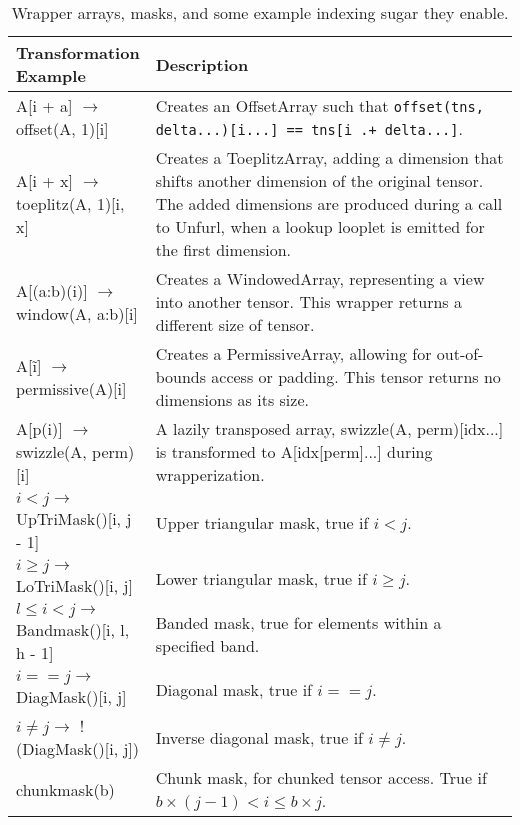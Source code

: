     \begin{table}[h]
        \scriptsize
        \centering
        \begin{tabular}{|>{\raggedright\arraybackslash}m{0.25\linewidth}|>{\raggedright\arraybackslash}m{0.75\linewidth}|}
        \hline
        \textbf{Transformation Example} & \textbf{Description} \\
        \hline
        A[i + a] $\rightarrow$ offset(A, 1)[i] & Creates an OffsetArray such that \texttt{offset(tns, delta...)[i...] == tns[i .+ delta...]}. \\
        \hline
        A[i + x] $\rightarrow$ toeplitz(A, 1)[i, x] & Creates a ToeplitzArray, adding a dimension that shifts another dimension of the original tensor. The added dimensions are produced during a call to Unfurl, when a lookup looplet is emitted for the first dimension. \\
        \hline
        A[(a:b)(i)] $\rightarrow$ window(A, a:b)[i] & Creates a WindowedArray, representing a view into another tensor. This wrapper returns a different size of tensor. \\
        \hline
        A[\~i] $\rightarrow$ permissive(A)[i] & Creates a PermissiveArray, allowing for out-of-bounds access or padding. This tensor returns no dimensions as its size. \\
        \hline
        \hline
        A[p(i)] $\rightarrow$ swizzle(A, perm)[i] & A lazily transposed array, swizzle(A, perm)[idx...] is transformed to A[idx[perm]...] during wrapperization. \\
        \hline
        $i < j \rightarrow$ UpTriMask()[i, j - 1] & Upper triangular mask, true if $i < j$. \\
        \hline
        $i \geq j \rightarrow$ LoTriMask()[i, j] & Lower triangular mask, true if $i \geq j$. \\
        \hline
        $l \leq i < j \rightarrow$ Bandmask()[i, l, h - 1] & Banded mask, true for elements within a specified band. \\
        \hline
        $i == j \rightarrow$ DiagMask()[i, j] & Diagonal mask, true if $i == j$. \\
        \hline
        $i \neq j \rightarrow$ !(DiagMask()[i, j]) & Inverse diagonal mask, true if $i \neq j$. \\
        \hline
        chunkmask(b) & Chunk mask, for chunked tensor access. True if $b \times (j - 1) < i \leq b \times j$. \\
        \hline
        \end{tabular}
        \caption{Wrapper arrays, masks, and some example indexing sugar they enable.}
    \label{tab:wrappers}
    \end{table}

